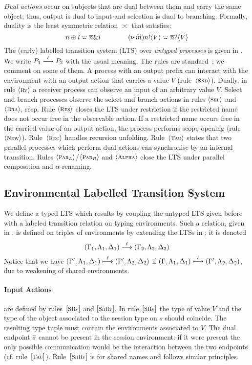 \emph{Dual actions}
occur on subjects that are dual between them and carry the same
object; thus, output is dual to input and 
selection is dual to branching.
Formally, duality 
is the least symmetric relation $\asymp$ that satisfies:
\[
	n \oplus l \asymp \overline{n} \& l
	\qquad \qquad 
	(\nu\, \widetilde{m}) n ! \langle V \rangle \asymp \overline{n} ? \langle V \rangle
\]
The (early) labelled transition system
(LTS) %
over \emph{untyped processes}
is given in
. 
We write $P_1 \stackrel{\ell}{\longrightarrow} P_2$ with the usual meaning.
The rules are standard~\cite{KYHH2015,KY2015}; we comment on some of them.
A process with an output prefix can
interact with the environment with an output action that carries a value
$V$ (rule~${\langle \text{\footnotesize \textsc{Snd}} \rangle}$).  Dually, in rule ${\langle \text{\footnotesize \textsc{Rv}} \rangle}$ a
receiver process can observe an input of an arbitrary value $V$.
Select and branch processes observe the select and branch
actions in rules ${\langle \text{\footnotesize \textsc{Sel}} \rangle}$ and ${\langle \text{\footnotesize \textsc{Bra}} \rangle}$, resp.
Rule ${\langle \text{\footnotesize \textsc{Res}} \rangle}$ closes the LTS under restriction 
if the restricted name does not occur free in the
observable action. 
If a restricted name occurs free in
the carried value of an output action,
the process performs scope opening (rule~${\langle \text{\footnotesize \textsc{New}} \rangle}$).  
Rule~${\langle \text{\footnotesize \textsc{Rec}} \rangle}$ handles recursion unfolding.
Rule~${\langle \text{\footnotesize \textsc{Tau}} \rangle}$ 
states that two parallel processes which perform
dual actions can synchronise by an internal transition.
Rules ${\langle \text{\footnotesize \textsc{Par${}_L$}} \rangle}$/${\langle \text{\footnotesize \textsc{Par${}_R$}} \rangle}$ 
and ${\langle \text{\footnotesize \textsc{Alpha}} \rangle}$ close the LTS
under parallel composition and $\alpha$-renaming. 

\subsection{Environmental Labelled Transition System}
\label{ss:elts}
We define a typed LTS which results by coupling the untyped LTS given before with a labeled transition relation 
on typing environments. Such a relation, given in , 
is defined on triples of environments by 
extending the LTSs
in \cite{KYHH2015,KY2015}; it is 
denoted
%
\[
	(\Gamma_1, \Lambda_1, \Delta_1) \stackrel{\ell}{\longrightarrow} (\Gamma_2, \Lambda_2, \Delta_2)
\]
%
Notice that  we have 
$
	(\Gamma', \Lambda_1, \Delta_1) \stackrel{\ell}{\longmapsto} (\Gamma', \Lambda_2, \Delta_2)
$
if
$
	(\Gamma, \Lambda_1, \Delta_1) \stackrel{\ell}{\longmapsto} (\Gamma', \Lambda_2, \Delta_2)
$, 
due to weakening of shared environments.
%
\paragraph{Input Actions} 
are defined by 
rules~${[\text{\footnotesize \textsc{SRv}}]}$ and ${[\text{\footnotesize \textsc{ShRv}}]}$.
In rule~${[\text{\footnotesize \textsc{SRv}}]}$
the type of value $V$
and the type of the object associated to the session type on $s$ 
should coincide. 
The resulting type tuple must contain the environments 
associated to $V$. 
The
dual endpoint $\overline{s}$ cannot be
present in the session environment: if it were present
the only possible communication would be the interaction
between the two endpoints (cf. rule~${[\text{\footnotesize \textsc{Tau}}]}$).
Rule~${[\text{\footnotesize \textsc{ShRv}}]}$ is for shared names and follows similar principles.

